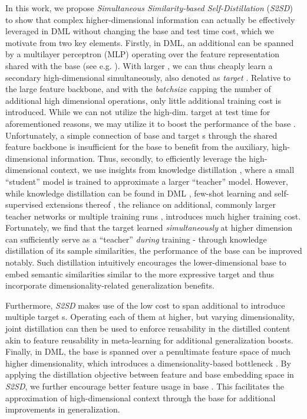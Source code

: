 \documentclass{article} \usepackage{arxiv_style,times}
\begin{document}
In this work, we propose \textit{Simultaneous Similarity-based Self-Distillation} (\textit{S2SD}) to show that complex higher-dimensional information can actually be effectively leveraged in DML without changing the base  and test time cost, which we motivate from two key elements. Firstly, in DML, an additional  can be spanned by a multilayer perceptron (MLP) operating over the feature representation shared with the base  (see e.g. \citep{milbich2020diva}). 
With larger , we can thus cheaply learn a secondary high-dimensional  simultaneously, also denoted as \textit{target} . 
Relative to the large feature backbone, and with the \emph{batchsize} capping the number of additional high dimensional operations, only little additional training cost is introduced. 
While we can not utilize the high-dim. target  at test time for aforementioned reasons, we may utilize it to boost the performance of the base .
Unfortunately, a simple connection of base and target s through the shared feature backbone is insufficient for the base  to benefit from the auxiliary, high-dimensional information.
Thus, secondly, to efficiently leverage the high-dimensional context, we use insights from knowledge distillation \citep{hinton2015distilling}, where a small ``student'' model is trained to approximate a larger ``teacher'' model.
However, while knowledge distillation can be found in DML \citep{chen2017darkrank}, few-shot learning \citep{tian2020rethinking} and self-supervised extensions thereof \citep{rajasegaran2020selfsupervised}, the reliance on additional, commonly larger teacher networks or multiple training runs \citep{furlanello2018born}, introduces much higher training cost.
Fortunately, we find that the target  learned \textit{simultaneously} at higher dimension can sufficiently serve as a ``teacher'' \textit{during} training - through knowledge distillation of its sample similarities, the performance of the base  can be improved notably.
Such distillation intuitively encourages the lower-dimensional base  to embed semantic similarities similar to the more expressive target  and thus incorporate dimensionality-related generalization benefits.

Furthermore, \textit{S2SD} makes use of the low cost to span additional  to introduce multiple target s. Operating each of them at higher, but varying dimensionality, joint distillation can then be used to enforce reusability in the distilled content akin to feature reusability in meta-learning \citep{raghu2019rapid} for additional generalization boosts. 
Finally, in DML, the base  is spanned over a penultimate feature space of much higher dimensionality, which introduces a dimensionality-based bottleneck \citep{milbich2020sharing}. By applying the distillation objective between feature and base embedding space in \textit{S2SD}, we further encourage better feature usage in base . This facilitates the approximation of high-dimensional context through the base  for additional improvements in generalization.
\end{document}
